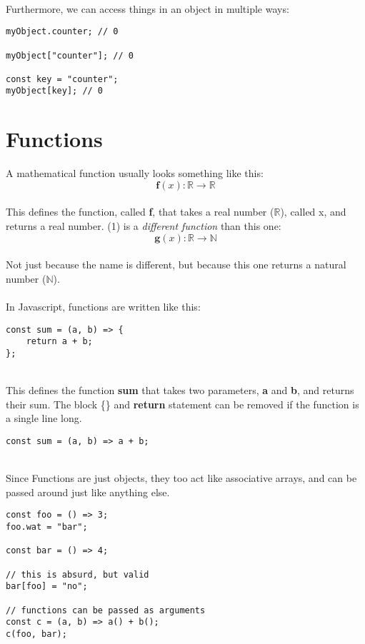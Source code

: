 \documentclass{article}
\begin{document}
\noindent
\\
Furthermore, we can access things in an object in multiple ways:

\begin{verbatim}
myObject.counter; // 0

myObject["counter"]; // 0

const key = "counter";
myObject[key]; // 0
\end{verbatim}

\section{Functions}

A mathematical function usually looks something like this:
\\
\begin{equation}
\textbf{f}(x):\mathbb{R}\rightarrow\mathbb{R}
\end{equation}
\\
This defines the function, called \textbf{f}, that takes a real number ($\mathbb{R}$), called x, and returns a real number. (1) is a \textit{different function} than this one:
\\
\begin{equation}
\textbf{g}(x):\mathbb{R}\rightarrow\mathbb{N}
\end{equation}
\\
Not just because the name is different, but because this one returns a natural number ($\mathbb{N}$).
\\
\\
In Javascript, functions are written like this:
\\
\begin{verbatim}
const sum = (a, b) => {
	return a + b;
};
\end{verbatim}

\noindent
\\
This defines the function \textbf{sum} that takes two parameters, \textbf{a} and \textbf{b}, and returns their sum. The block \{\} and \textbf{return} statement can be removed if the function is a single line long.
\\
\begin{verbatim}
const sum = (a, b) => a + b;
\end{verbatim}
\noindent
\\
Since Functions are just objects, they too act like associative arrays, and can be passed around just like anything else.
\\
\begin{verbatim}
const foo = () => 3;
foo.wat = "bar";

const bar = () => 4;

// this is absurd, but valid
bar[foo] = "no";

// functions can be passed as arguments
const c = (a, b) => a() + b();
c(foo, bar);
\end{verbatim}
\end{document}
